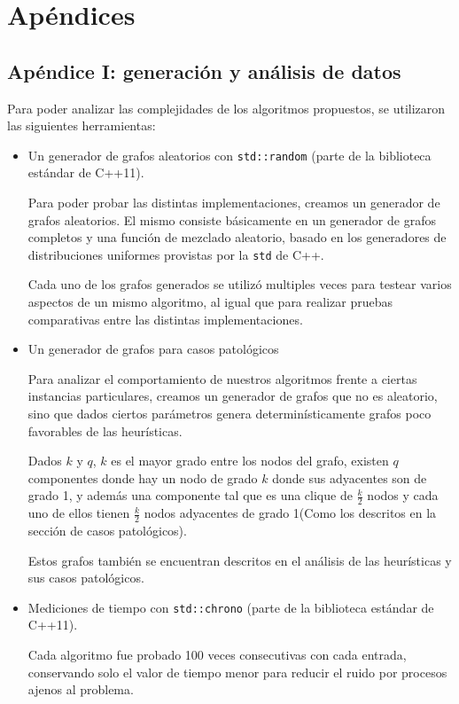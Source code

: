 \section{Apéndices}
	\subsection{Apéndice I: generación y análisis de datos}

	Para poder analizar las complejidades de los algoritmos propuestos, se utilizaron las siguientes herramientas:

	\begin{itemize}
		\item Un generador de grafos aleatorios con \texttt{std::random} (parte de la biblioteca estándar de C++11).

		Para poder probar las distintas implementaciones, creamos un generador de grafos aleatorios. El mismo consiste básicamente en un generador de grafos completos y una función de mezclado aleatorio, basado en los generadores de distribuciones uniformes provistas por la \texttt{std} de C++.

		Cada uno de los grafos generados se utilizó multiples veces para testear varios aspectos de un mismo algoritmo, al igual que para realizar pruebas comparativas entre las distintas implementaciones.

		\item Un generador de grafos para casos patológicos

		Para analizar el comportamiento de nuestros algoritmos frente a ciertas instancias particulares, creamos un generador de grafos que no es aleatorio, sino que dados ciertos parámetros genera determinísticamente grafos poco favorables de las heurísticas.

		Dados $k$ y $q$, $k$ es el mayor grado entre los nodos del grafo, existen $q$ componentes donde hay un nodo de grado $k$ donde sus adyacentes son de grado 1, y además una componente tal que es una clique de $\frac{k}{2}$ nodos y cada uno de ellos tienen $\frac{k}{2}$ nodos adyacentes de grado 1(Como los descritos en la sección de casos patológicos).

		Estos grafos también se encuentran descritos en el análisis de las heurísticas y sus casos patológicos.

		\item Mediciones de tiempo con \texttt{std::chrono} (parte de la biblioteca estándar de C++11).

		Cada algoritmo fue probado 100 veces consecutivas con cada entrada, conservando solo el valor de tiempo menor para reducir el ruido por procesos ajenos al problema.


\end{itemize}
